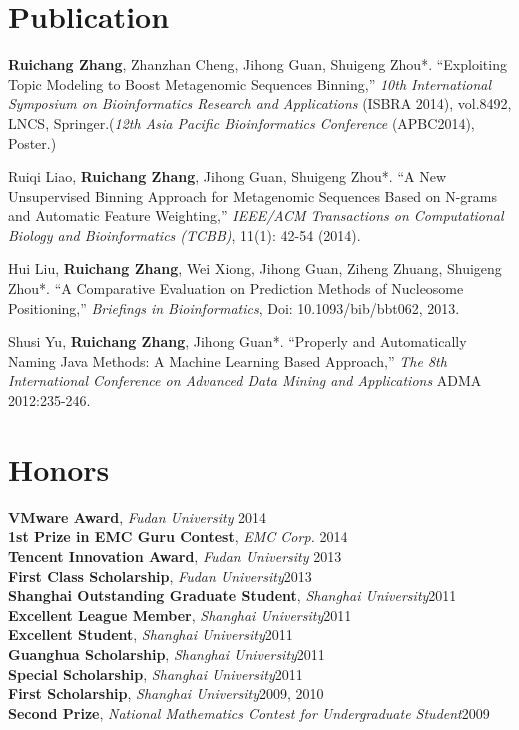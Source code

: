 \documentclass[margin]{res}
\begin{document}
\begin{resume}
\section{Publication}
\textbf{Ruichang Zhang}, Zhanzhan Cheng, Jihong Guan, Shuigeng Zhou*. ``Exploiting Topic Modeling to Boost Metagenomic Sequences Binning,'' \emph{10th International Symposium on Bioinformatics Research and Applications} (ISBRA 2014), vol.8492, LNCS, Springer.(\emph{12th Asia Pacific Bioinformatics Conference} (APBC2014), Poster.)\\
\begin{spacing}{0.2}
\end{spacing}
Ruiqi Liao, \textbf{Ruichang Zhang}, Jihong Guan, Shuigeng Zhou*. ``A New Unsupervised Binning Approach for Metagenomic Sequences Based on N-grams and Automatic Feature Weighting,'' \emph{IEEE/ACM Transactions on Computational Biology and Bioinformatics (TCBB)}, 11(1): 42-54 (2014).\\
\begin{spacing}{0.2}
\end{spacing}
Hui Liu, \textbf{Ruichang Zhang}, Wei Xiong, Jihong Guan, Ziheng Zhuang, Shuigeng Zhou*. ``A Comparative Evaluation on Prediction Methods of Nucleosome Positioning,''  \emph{Briefings in Bioinformatics}, Doi: 10.1093/bib/bbt062, 2013.\\
\begin{spacing}{0.2}
\end{spacing}
Shusi Yu, \textbf{Ruichang Zhang}, Jihong Guan*. ``Properly and Automatically Naming Java Methods: A Machine Learning Based Approach,'' \emph{The 8th International Conference on Advanced Data Mining and Applications} ADMA 2012:235-246.

\section{Honors}
\textbf{VMware Award}, \emph{Fudan University} \hfill2014\\
\textbf{1st Prize in EMC Guru Contest}, \emph{EMC Corp.} \hfill2014\\
\textbf{Tencent Innovation Award}, \emph{Fudan University} \hfill2013\\
\textbf{First Class Scholarship}, \emph{Fudan University}\hfill2013\\
\textbf{Shanghai Outstanding Graduate Student}, \emph{Shanghai University}\hfill 2011\\
\textbf{Excellent League Member}, \emph{Shanghai University}\hfill 2011\\
\textbf{Excellent Student}, \emph{Shanghai University}\hfill 2011\\
\textbf{Guanghua Scholarship}, \emph{Shanghai University}\hfill 2011\\
\textbf{Special Scholarship}, \emph{Shanghai University}\hfill 2011\\
\textbf{First Scholarship}, \emph{Shanghai University}\hfill 2009, 2010\\
\textbf{Second Prize}, \emph{National Mathematics Contest for Undergraduate Student}\hfill 2009\\


\end{resume}
\end{document}
